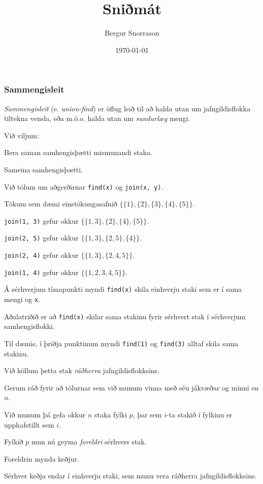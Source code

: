 \title{Sniðmát}
\author{Bergur Snorrason}
\date{\today}



\frame{\titlepage}

{
	\frametitle{Sammengisleit}
	{
		\item<1-> \emph{Sammengisleit} (e. \emph{union-find}) er öflug leið til að halda utan um jafngildisflokka tiltekna vensla,
				eða m.ö.o. halda utan um \emph{sundurlæg} mengi.
		\item<2-> Við viljum:
		{
			\item<3-> Bera saman samhengisþætti mismunandi staka.
			\item<4-> Sameina samhengisþætti.
		}
		\item<5-> Við tölum um aðgerðirnar \texttt{find(x)} og \texttt{join(x, y)}.
	}
}

{
	{
		\item<1-> Tökum sem dæmi einstökungasafnið
			$\{\{1\}, \{2\}, \{3\}, \{4\}, \{5\}\}$. 
		\item<2-> \texttt{join(1, 3)} gefur okkur
			$\{\{1, 3\}, \{2\}, \{4\}, \{5\}\}$. 
		\item<3-> \texttt{join(2, 5)} gefur okkur
			$\{\{1, 3\}, \{2, 5\}, \{4\}\}$. 
		\item<4-> \texttt{join(2, 4)} gefur okkur
			$\{\{1, 3\}, \{2, 4, 5\}\}$. 
		\item<5-> \texttt{join(1, 4)} gefur okkur
			$\{\{1, 2, 3, 4, 5\}\}$. 
		\item<6-> Á sérhverjum tímapunkti myndi \texttt{find(x)} skila einhverju staki sem er í sama mengi og \texttt{x}.
		\item<7-> Aðalatriðið er að \texttt{find(x)} skilar sama stakinu fyrir sérhvert stak í sérhverjum samhengisflokki.
		\item<8-> Til dæmis, í þriðja punktinum myndi \texttt{find(1)} og \texttt{find(3)} alltaf skila sama stakinu.
		\item<9-> Við köllum þetta stak \emph{ráðherra} jafngildisflokksins.
	}
}

{
	{
		\item<1-> Gerum ráð fyrir að tölurnar sem við munum vinna með séu jákvæðar og minni en $n$.
		\item<2-> Við munum þá gefa okkur $n$ staka fylki $p$, þar sem $i$-ta stakið í fylkinu er upphafstillt sem $i$.
		\item<3-> Fylkið $p$ mun nú geyma \emph{foreldri} sérhvers stak.
		\item<4-> Foreldrin mynda keðjur.
		\item<5-> Sérhver keðja endar í einhverju staki, sem munu vera ráðherra jafngildisflokksins.
	}
}


